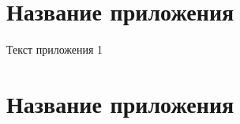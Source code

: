 \chapter{Название приложения}
  \label{appendix:example}
  Текст приложения 1

  \newpage
\chapter{Название приложения}
